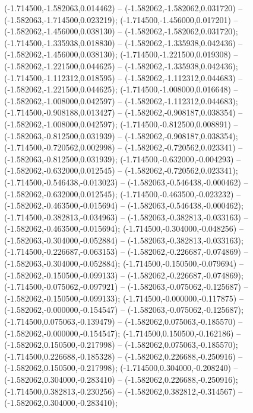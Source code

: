 (-1.714500,-1.582063,0.014462) -- (-1.582062,-1.582062,0.031720) -- (-1.582063,-1.714500,0.023219);
 (-1.714500,-1.456000,0.017201) -- (-1.582062,-1.456000,0.038130) -- (-1.582062,-1.582062,0.031720);
 (-1.714500,-1.335938,0.018830) -- (-1.582062,-1.335938,0.042436) -- (-1.582062,-1.456000,0.038130);
 (-1.714500,-1.221500,0.019308) -- (-1.582062,-1.221500,0.044625) -- (-1.582062,-1.335938,0.042436);
 (-1.714500,-1.112312,0.018595) -- (-1.582062,-1.112312,0.044683) -- (-1.582062,-1.221500,0.044625);
 (-1.714500,-1.008000,0.016648) -- (-1.582062,-1.008000,0.042597) -- (-1.582062,-1.112312,0.044683);
 (-1.714500,-0.908188,0.013427) -- (-1.582062,-0.908187,0.038354) -- (-1.582062,-1.008000,0.042597);
 (-1.714500,-0.812500,0.008891) -- (-1.582063,-0.812500,0.031939) -- (-1.582062,-0.908187,0.038354);
 (-1.714500,-0.720562,0.002998) -- (-1.582062,-0.720562,0.023341) -- (-1.582063,-0.812500,0.031939);
 (-1.714500,-0.632000,-0.004293) -- (-1.582062,-0.632000,0.012545) -- (-1.582062,-0.720562,0.023341);
 (-1.714500,-0.546438,-0.013023) -- (-1.582063,-0.546438,-0.000462) -- (-1.582062,-0.632000,0.012545);
 (-1.714500,-0.463500,-0.023232) -- (-1.582062,-0.463500,-0.015694) -- (-1.582063,-0.546438,-0.000462);
 (-1.714500,-0.382813,-0.034963) -- (-1.582063,-0.382813,-0.033163) -- (-1.582062,-0.463500,-0.015694);
 (-1.714500,-0.304000,-0.048256) -- (-1.582063,-0.304000,-0.052884) -- (-1.582063,-0.382813,-0.033163);
 (-1.714500,-0.226687,-0.063153) -- (-1.582062,-0.226687,-0.074869) -- (-1.582063,-0.304000,-0.052884);
 (-1.714500,-0.150500,-0.079694) -- (-1.582062,-0.150500,-0.099133) -- (-1.582062,-0.226687,-0.074869);
 (-1.714500,-0.075062,-0.097921) -- (-1.582063,-0.075062,-0.125687) -- (-1.582062,-0.150500,-0.099133);
 (-1.714500,-0.000000,-0.117875) -- (-1.582062,-0.000000,-0.154547) -- (-1.582063,-0.075062,-0.125687);
 (-1.714500,0.075063,-0.139479) -- (-1.582062,0.075063,-0.185570) -- (-1.582062,-0.000000,-0.154547);
 (-1.714500,0.150500,-0.162186) -- (-1.582062,0.150500,-0.217998) -- (-1.582062,0.075063,-0.185570);
 (-1.714500,0.226688,-0.185328) -- (-1.582062,0.226688,-0.250916) -- (-1.582062,0.150500,-0.217998);
 (-1.714500,0.304000,-0.208240) -- (-1.582062,0.304000,-0.283410) -- (-1.582062,0.226688,-0.250916);
 (-1.714500,0.382813,-0.230256) -- (-1.582062,0.382812,-0.314567) -- (-1.582062,0.304000,-0.283410);
